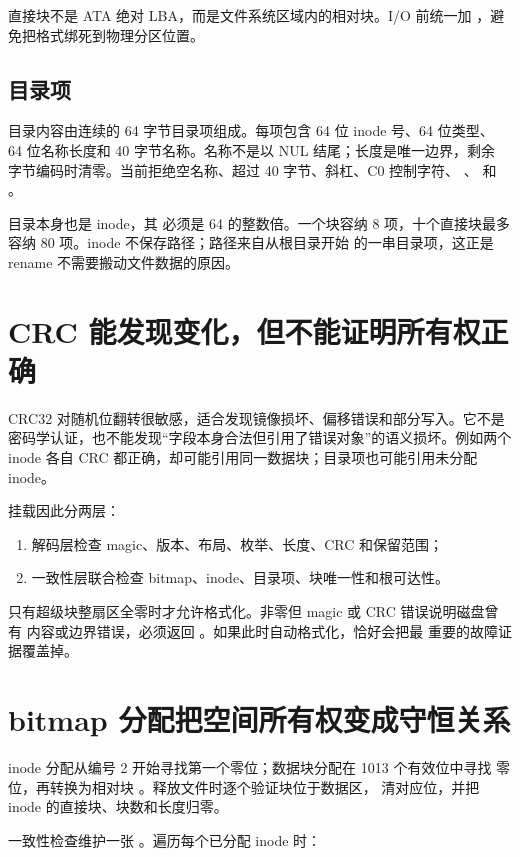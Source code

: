 直接块不是 ATA 绝对 LBA，而是文件系统区域内的相对块。I/O 前统一加
，避免把格式绑死到物理分区位置。

\subsection{目录项}

目录内容由连续的 64 字节目录项组成。每项包含 64 位 inode 号、64 位类型、
64 位名称长度和 40 字节名称。名称不是以 NUL 结尾；长度是唯一边界，剩余
字节编码时清零。当前拒绝空名称、超过 40 字节、斜杠、C0 控制字符、
、 和 。

目录本身也是 inode，其  必须是 64 的整数倍。一个块容纳
8 项，十个直接块最多容纳 80 项。inode 不保存路径；路径来自从根目录开始
的一串目录项，这正是 rename 不需要搬动文件数据的原因。

\section{CRC 能发现变化，但不能证明所有权正确}

CRC32 对随机位翻转很敏感，适合发现镜像损坏、偏移错误和部分写入。它不是
密码学认证，也不能发现“字段本身合法但引用了错误对象”的语义损坏。例如两个
inode 各自 CRC 都正确，却可能引用同一数据块；目录项也可能引用未分配 inode。

挂载因此分两层：

\begin{enumerate}[label=\arabic*.]
  \item 解码层检查 magic、版本、布局、枚举、长度、CRC 和保留范围；
  \item 一致性层联合检查 bitmap、inode、目录项、块唯一性和根可达性。
\end{enumerate}

只有超级块整扇区全零时才允许格式化。非零但 magic 或 CRC 错误说明磁盘曾有
内容或边界错误，必须返回 。如果此时自动格式化，恰好会把最
重要的故障证据覆盖掉。

\section{bitmap 分配把空间所有权变成守恒关系}

inode 分配从编号 2 开始寻找第一个零位；数据块分配在 1013 个有效位中寻找
零位，再转换为相对块 。释放文件时逐个验证块位于数据区，
清对应位，并把 inode 的直接块、块数和长度归零。

一致性检查维护一张 。遍历每个已分配 inode 时：


